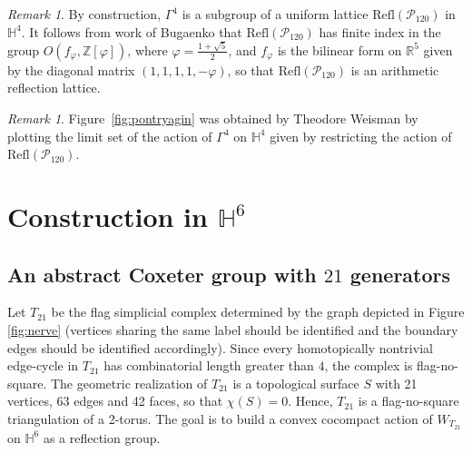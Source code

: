 \documentclass{amsart}
\theoremstyle{plain}
\theoremstyle{definition}
\theoremstyle{remark}
\newtheorem{remark}[theorem]{Remark}
\numberwithin{equation}{section}
\newcommand{\hh}{\mathbb H}
\newcommand{\T}{T_{21}}
\begin{document}
\begin{remark}
    By construction, $\Gamma^4$ is a subgroup of a uniform lattice $\mathrm{Refl}(\mathcal{P}_{120})$ in $\hh^4$. It follows from work of Bugaenko \cite{bugaenko} that $\mathrm{Refl}(\mathcal{P}_{120})$ has finite index in the group $O(f_\varphi , \mathbb{Z}[\varphi])$, where $\varphi = \frac{1+ \sqrt{5}}{2}$, and $f_\varphi$ is the bilinear form on $\mathbb{R}^5$ given by the diagonal matrix $(1,1,1,1, -\varphi)$, so that $\mathrm{Refl}(\mathcal{P}_{120})$ is an arithmetic reflection lattice.
\end{remark}

\begin{remark}
Figure~\ref{fig:pontryagin} was obtained by Theodore Weisman by plotting the limit set of the action of $\Gamma^4$ on $\hh^4$ given by restricting the action of $\mathrm{Refl}(\mathcal{P}_{120})$.
\end{remark}



\section{Construction in \texorpdfstring{$\hh^6$}{H6}}


\subsection{An abstract Coxeter group with \texorpdfstring{$21$}{21} generators}

Let $\T$ be the flag simplicial complex determined by the graph depicted in Figure \ref{fig:nerve} (vertices sharing the same label should be identified and the boundary edges should be identified accordingly). Since every homotopically nontrivial edge-cycle in $\T$ has combinatorial length greater than $4$, the complex is flag-no-square. The geometric realization of $\T$ is a topological surface $S$ with 21 vertices, 63 edges and 42 faces, so that $\chi (S)= 0$. Hence, $\T$ is a flag-no-square triangulation of a 2-torus. The goal is to build a convex cocompact action of $W_{\T}$ on $\hh^6$ as a reflection group.
\end{document}
